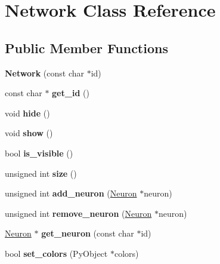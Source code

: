 \hypertarget{classNetwork}{\section{Network Class Reference}
\label{classNetwork}
}
\subsection*{Public Member Functions}
\begin{DoxyCompactItemize}
\item 
\hypertarget{classNetwork_ab7ccee42fea8dfd77df89fec5a8949d9}{{\bfseries Network} (const char $\ast$id)}\label{classNetwork_ab7ccee42fea8dfd77df89fec5a8949d9}

\item 
\hypertarget{classNetwork_a3dbb447aeda1a6dcb3ecce463ac7ccde}{const char $\ast$ {\bfseries get\-\_\-id} ()}\label{classNetwork_a3dbb447aeda1a6dcb3ecce463ac7ccde}

\item 
\hypertarget{classNetwork_a853b4e2e13c86d5b12a83916b2396040}{void {\bfseries hide} ()}\label{classNetwork_a853b4e2e13c86d5b12a83916b2396040}

\item 
\hypertarget{classNetwork_a6d2b08a17ea5418e4ffc0640f4f3ac18}{void {\bfseries show} ()}\label{classNetwork_a6d2b08a17ea5418e4ffc0640f4f3ac18}

\item 
\hypertarget{classNetwork_a6c8e3dca1424f671ec54ac940ff6f321}{bool {\bfseries is\-\_\-visible} ()}\label{classNetwork_a6c8e3dca1424f671ec54ac940ff6f321}

\item 
\hypertarget{classNetwork_af06e1d212d3eed63fe194e7ee91fa8c0}{unsigned int {\bfseries size} ()}\label{classNetwork_af06e1d212d3eed63fe194e7ee91fa8c0}

\item 
\hypertarget{classNetwork_a68f136fbf2b4959e6c0ce82003c624c1}{unsigned int {\bfseries add\-\_\-neuron} (\hyperlink{classNeuron}{Neuron} $\ast$neuron)}\label{classNetwork_a68f136fbf2b4959e6c0ce82003c624c1}

\item 
\hypertarget{classNetwork_a3bf0dbc0b966cfe713f858e7ce935a02}{unsigned int {\bfseries remove\-\_\-neuron} (\hyperlink{classNeuron}{Neuron} $\ast$neuron)}\label{classNetwork_a3bf0dbc0b966cfe713f858e7ce935a02}

\item 
\hypertarget{classNetwork_a170ddd2426433b8d258969c93e2fcf30}{\hyperlink{classNeuron}{Neuron} $\ast$ {\bfseries get\-\_\-neuron} (const char $\ast$id)}\label{classNetwork_a170ddd2426433b8d258969c93e2fcf30}

\item 
\hypertarget{classNetwork_a87f69dafc79b4e7120477a83ca97a223}{bool {\bfseries set\-\_\-colors} (Py\-Object $\ast$colors)}\label{classNetwork_a87f69dafc79b4e7120477a83ca97a223}

\end{DoxyCompactItemize}

